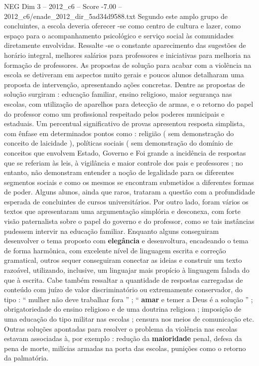 \begin{textsample}{NEG Dim 3 – 2012\_c6 – Score -7.00 – 2012\_c6/enade\_2012\_dir\_5ad34d9588.txt}
Segundo este amplo grupo de concluintes, a escola deveria oferecer -se como centro de cultura e lazer, como espaço para o acompanhamento psicológico e serviço social às comunidades diretamente envolvidas.
Ressalte -se o constante aparecimento das sugestões de horário integral, melhores salários para professores e iniciativas para melhoria na formação de professores.
As propostas de solução para acabar com a violência na escola se detiveram em aspectos muito gerais e poucos alunos detalharam uma proposta de intervenção, apresentando ações concretas.
Dentre as propostas de solução surgiram : educação familiar, ensino religioso, maior segurança nas escolas, com utilização de aparelhos para detecção de armas, e o retorno do papel do professor como um profissional respeitado pelos poderes municipais e estaduais.
Um percentual significativo de provas apresentou resposta simplista, com ênfase em determinados pontos como : religião ( sem demonstração do conceito de laicidade ), políticas sociais ( sem demonstração do domínio de conceitos que envolvem Estado, Governo e Foi grande a incidência de respostas que se referiam às leis, à vigilância e maior controle dos pais e professores ; no entanto, não demonstram entender a noção de legalidade para os diferentes segmentos sociais e como os mesmos se encontram submetidos a diferentes formas de poder.
Alguns alunos, ainda que raros, trataram a questão com a profundidade esperada de concluintes de cursos universitários.
Por outro lado, foram vários os textos que apresentaram uma argumentação simplória e desconexa, com forte visão paternalista sobre o papel do governo e do professor, como se tais instâncias pudessem intervir na educação familiar.
Enquanto alguns conseguiram desenvolver o tema proposto com \textbf{elegância} e desenvoltura, encadeando o tema de forma harmônica, com excelente nível de linguagem escrita e correção gramatical, outros sequer conseguiram conectar as ideias e construir um texto razoável, utilizando, inclusive, um linguajar mais propício à linguagem falada do que à escrita.
Cabe também ressaltar a quantidade de respostas carregadas de conteúdo com juízo de valor discriminatório ou extremamente conservador, do tipo : “ mulher não deve trabalhar fora ” ; “ \textbf{amar} e temer a Deus é a solução ” ; obrigatoriedade do ensino religioso e de uma doutrina religiosa ; imposição de uma educação do tipo militar nas escolas ; censura nos meios de comunicação etc.
Outras soluções apontadas para resolver o problema da violência nas escolas estavam associadas à, por exemplo : redução da \textbf{maioridade} penal, defesa da pena de morte, milícias armadas na porta das escolas, punições como o retorno da palmatória.

\end{textsample}
